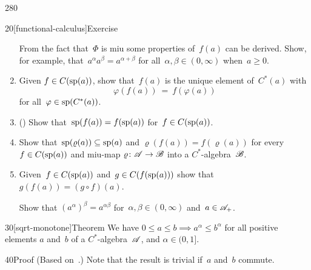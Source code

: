 \begin{parsec}{280}
\begin{point}{20}[functional-calculus]{Exercise}
\begin{enumerate}
From the fact that~$\Phi$ is miu some properties
of~$f(a)$ can be derived.
Show, for example,
that~$a^\alpha a^\beta = a^{\alpha+\beta}$
for all~$\alpha,\beta\in(0,\infty)$
when~$a\geq 0$.
\item
Given $f\in C(\mathrm{sp}(a))$,
show that~$f(a)$ is the unique element of~$C^*(a)$
with 
\begin{equation*}
	\varphi(f(a))
	 \ =\ f(\varphi(a))
\end{equation*}
for all~$\varphi\in\mathrm{sp}(C^*(a))$.
\item
()%
Show that~$\mathrm{sp}(f(a))=f(\mathrm{sp}(a))$
for~$f\in C(\mathrm{sp}(a))$.
\item
Show that~$\mathrm{sp}(\varrho(a))\subseteq
\mathrm{sp}(a)$
and $\varrho(f(a))=f(\varrho(a))$
for every $f\in C(\mathrm{sp}(a))$ and  miu-map
$\varrho\colon \mathscr{A}\to\mathscr{B}$
into a $C^*$-algebra~$\mathscr{B}$.
\item
Given~$f\in C(\mathrm{sp}(a))$ and~$g\in C(f(\mathrm{sp}(a)))$
show that $g(f(a))=(g\circ f)(a)$.

Show that $(a^\alpha)^\beta = a^{\alpha\beta}$
for~$\alpha,\beta\in (0,\infty)$
and~$a\in\mathscr{A}_+$.
\end{enumerate}%
\spacingfix{}%
\end{point}%
\begin{point}{30}[sqrt-monotone]{Theorem}%
We have $0\leq a\leq b \implies a^\alpha \leq b^\alpha$
for all positive elements $a$ and~$b$
of a $C^*$-algebra~$\mathscr{A}$,
and $\alpha\in (0,1]$.
\begin{point}{40}{Proof}%
(Based on~\cite{pedersen1972}.)
Note that the result is trivial if~$a$ and~$b$ commute.


\end{point}
\end{point}
\end{parsec}
